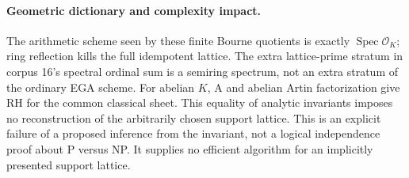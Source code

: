 \paragraph{Geometric dictionary and complexity impact.}
The arithmetic scheme seen by these finite Bourne quotients is
exactly $\operatorname{Spec}\mathcal O_K$; ring reflection kills
the full idempotent lattice. The extra lattice-prime stratum in
corpus 16's spectral ordinal sum is a semiring spectrum, not an
extra stratum of the ordinary EGA scheme. For abelian $K$, A and
abelian Artin factorization give RH for the common classical
sheet. This equality of analytic invariants imposes no reconstruction
of the arbitrarily chosen support lattice. This is an explicit
failure of a proposed inference from the invariant, not a logical
independence proof about P versus NP. It supplies no efficient
algorithm for an implicitly presented support lattice.
